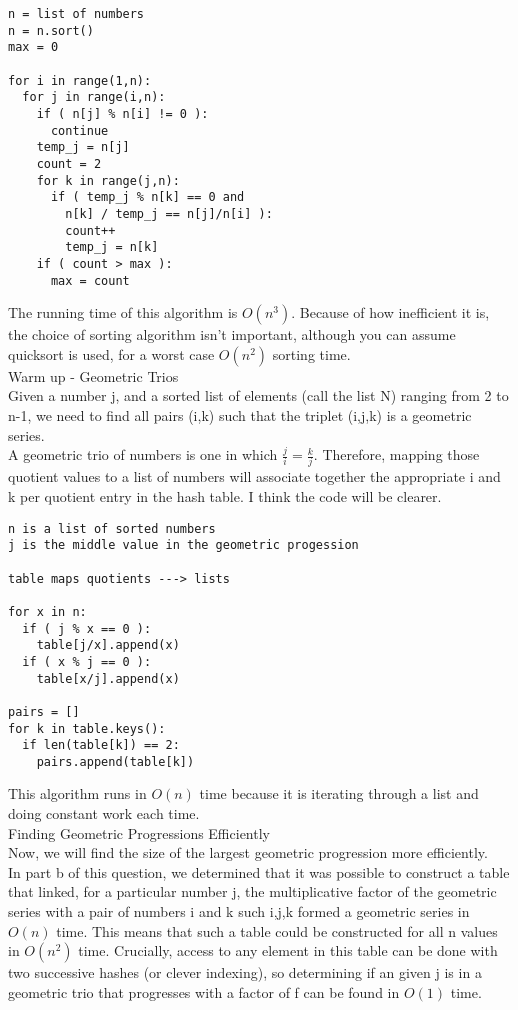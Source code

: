 \documentclass[12pt,twoside]{article}
\begin{document}
\begin{problems}
\begin{problemparts}
\begin{lstlisting}
n = list of numbers
n = n.sort()
max = 0

for i in range(1,n):
  for j in range(i,n):
    if ( n[j] % n[i] != 0 ):
      continue
    temp_j = n[j]
    count = 2
    for k in range(j,n):
      if ( temp_j % n[k] == 0 and 
		n[k] / temp_j == n[j]/n[i] ):
        count++
        temp_j = n[k]
    if ( count > max ):
      max = count
\end{lstlisting}

The running time of this algorithm is $O(n^3)$.  Because of how inefficient it is, the choice of sorting algorithm isn't important, although you can assume quicksort is used, for a worst case $O(n^2)$ sorting time.\\

\problempart Warm up - Geometric Trios\\
Given a number j, and a sorted list of elements (call the list N) ranging from 2 to n-1, we need to find all pairs (i,k) such that the triplet (i,j,k) is a geometric series.\\

A geometric trio of numbers is one in which $\frac{j}{i} = \frac{k}{j}$.  Therefore, mapping those quotient values to a list of numbers will associate together the appropriate i and k per quotient entry in the hash table.  I think the code will be clearer.\\

\begin{lstlisting}
n is a list of sorted numbers
j is the middle value in the geometric progession

table maps quotients ---> lists

for x in n:
  if ( j % x == 0 ):
    table[j/x].append(x)
  if ( x % j == 0 ):
    table[x/j].append(x)

pairs = []
for k in table.keys():
  if len(table[k]) == 2:
    pairs.append(table[k])
\end{lstlisting}

This algorithm runs in $O(n)$ time because it is iterating through a list and doing constant work each time.\\

\problempart Finding Geometric Progressions Efficiently\\
Now, we will find the size of the largest geometric progression more efficiently.\\

In part b of this question, we determined that it was possible to construct a table that linked, for a particular number j, the multiplicative factor of the geometric series with a pair of numbers i and k such i,j,k formed a geometric series  in $O(n)$ time.  This means that such a table could be constructed for all n values in $O(n^2)$ time.  Crucially, access to any element in this table can be done with two successive hashes (or clever indexing), so determining if an given j is in a geometric trio that progresses with a factor of f can be found in $O(1)$ time.\\


\end{problemparts}
\end{problems}
\end{document}
